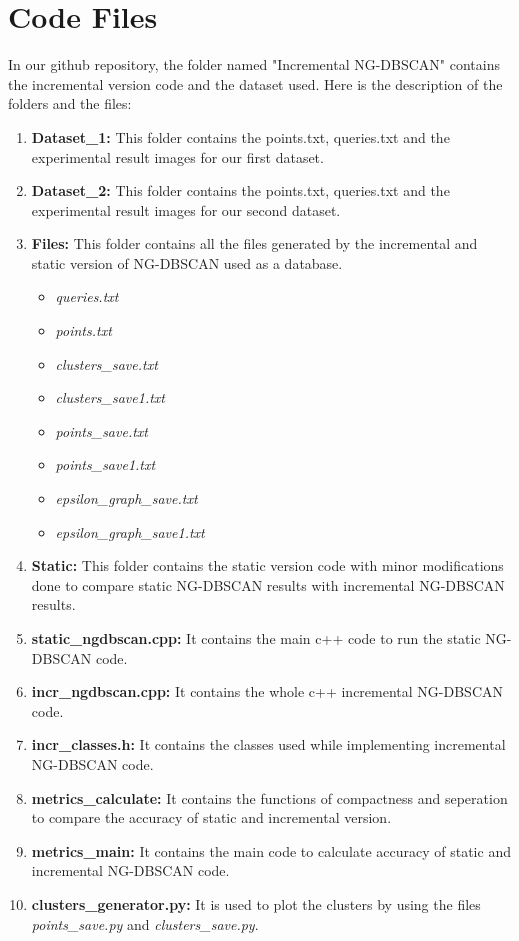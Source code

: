 \documentclass[acmsmall]{acmart}
\begin{document}
\section*{Code Files}
In our github repository, the folder named "Incremental NG-DBSCAN" contains the incremental version code and the dataset used. Here is the description of the folders and the files:
\begin{enumerate}
    \item \textbf{Dataset\_1: }This folder contains the points.txt, queries.txt and the experimental result images for our first dataset.
    \item \textbf{Dataset\_2: }This folder contains the points.txt, queries.txt and the experimental result images for our second dataset.
    \item \textbf{Files: }This folder contains all the files generated by the incremental and static version of NG-DBSCAN used as a database.
        \begin{itemize}
            \item \textit{queries.txt}
            \item \textit{points.txt}
            \item \textit{clusters\_save.txt}
            \item \textit{clusters\_save1.txt}
            \item \textit{points\_save.txt}
            \item \textit{points\_save1.txt}
            \item \textit{epsilon\_graph\_save.txt}
            \item \textit{epsilon\_graph\_save1.txt}
        \end{itemize}
    \item \textbf{Static: }This folder contains the static version code with minor modifications done to compare static NG-DBSCAN results with incremental NG-DBSCAN results.
    \item \textbf{static\_ngdbscan.cpp: }It contains the main c++ code to run the static NG-DBSCAN code. 
    \item \textbf{incr\_ngdbscan.cpp: }It contains the whole c++ incremental NG-DBSCAN code.
    \item \textbf{incr\_classes.h: }It contains the classes used while implementing incremental NG-DBSCAN code.
    \item \textbf{metrics\_calculate: }It contains the functions of compactness and seperation to compare the accuracy of static and incremental version.
    \item \textbf{metrics\_main: }It contains the main code to calculate accuracy of static and incremental NG-DBSCAN code.
    \item \textbf{clusters\_generator.py: }It is used to plot the clusters by using the files \textit{points\_save.py} and \textit{clusters\_save.py}.
\end{enumerate}
\end{document}

